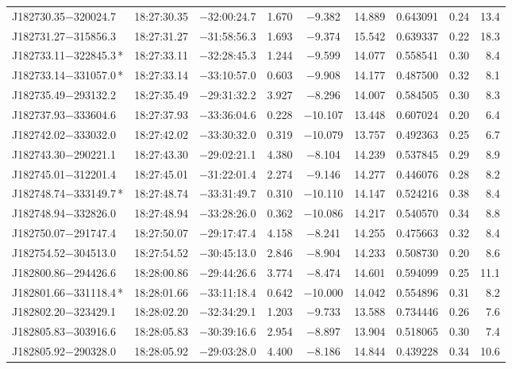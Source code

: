 \begin{table*}
\begin{tabular}{lcccccccr}
J182730.35$-$320024.7 & 18:27:30.35 & $-$32:00:24.7 &  1.670 & $-$9.382 & 14.889 & 0.643091 & 0.24 & 13.4 \\
J182731.27$-$315856.3 & 18:27:31.27 & $-$31:58:56.3 &  1.693 & $-$9.374 & 15.542 & 0.639337 & 0.22 & 18.3 \\
J182733.11$-$322845.3\,* & 18:27:33.11 & $-$32:28:45.3 &  1.244 & $-$9.599 & 14.077 & 0.558541 & 0.30 & 8.4 \\
J182733.14$-$331057.0\,* & 18:27:33.14 & $-$33:10:57.0 &  0.603 & $-$9.908 & 14.177 & 0.487500 & 0.32 & 8.1 \\
J182735.49$-$293132.2 & 18:27:35.49 & $-$29:31:32.2 &  3.927 & $-$8.296 & 14.007 & 0.584505 & 0.30 & 8.3 \\
J182737.93$-$333604.6 & 18:27:37.93 & $-$33:36:04.6 &  0.228 & $-$10.107 & 13.448 & 0.607024 & 0.20 & 6.4 \\
J182742.02$-$333032.0 & 18:27:42.02 & $-$33:30:32.0 &  0.319 & $-$10.079 & 13.757 & 0.492363 & 0.25 & 6.7 \\
J182743.30$-$290221.1 & 18:27:43.30 & $-$29:02:21.1 &  4.380 & $-$8.104 & 14.239 & 0.537845 & 0.29 & 8.9 \\
J182745.01$-$312201.4 & 18:27:45.01 & $-$31:22:01.4 &  2.274 & $-$9.146 & 14.277 & 0.446076 & 0.28 & 8.2 \\
J182748.74$-$333149.7\,* & 18:27:48.74 & $-$33:31:49.7 &  0.310 & $-$10.110 & 14.147 & 0.524216 & 0.38 & 8.4 \\
J182748.94$-$332826.0 & 18:27:48.94 & $-$33:28:26.0 &  0.362 & $-$10.086 & 14.217 & 0.540570 & 0.34 & 8.8 \\
J182750.07$-$291747.4 & 18:27:50.07 & $-$29:17:47.4 &  4.158 & $-$8.241 & 14.255 & 0.475663 & 0.32 & 8.4 \\
J182754.52$-$304513.0 & 18:27:54.52 & $-$30:45:13.0 &  2.846 & $-$8.904 & 14.233 & 0.508730 & 0.20 & 8.6 \\
J182800.86$-$294426.6 & 18:28:00.86 & $-$29:44:26.6 &  3.774 & $-$8.474 & 14.601 & 0.594099 & 0.25 & 11.1 \\
J182801.66$-$331118.4\,* & 18:28:01.66 & $-$33:11:18.4 &  0.642 & $-$10.000 & 14.042 & 0.554896 & 0.31 & 8.2 \\
J182802.20$-$323429.1 & 18:28:02.20 & $-$32:34:29.1 &  1.203 & $-$9.733 & 13.588 & 0.734446 & 0.26 & 7.6 \\
J182805.83$-$303916.6 & 18:28:05.83 & $-$30:39:16.6 &  2.954 & $-$8.897 & 13.904 & 0.518065 & 0.30 & 7.4 \\
J182805.92$-$290328.0 & 18:28:05.92 & $-$29:03:28.0 &  4.400 & $-$8.186 & 14.844 & 0.439228 & 0.34 & 10.6 \\

\end{tabular}
\end{table*}

